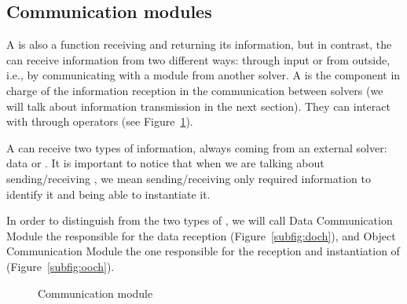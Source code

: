 \subsection{Communication modules}


A \opch{} is also a function receiving and returning its information, but in contrast, the \opch{} can receive information from two different ways: through input or from outside, i.e., by communicating with a module from another solver. A \opch{} is the component in charge of the information reception in the communication between solvers (we will talk about information transmission in the next section). They can interact with \oms{} through operators (see Figure~\ref{fig:och}).

A \opch{} can receive two types of information, always coming from an external solver: data or \oms{}. It is important to notice that when we are talking about sending/receiving \oms, we mean sending/receiving only required information to identify it and being able to instantiate it.

In order to distinguish from the two types of \opchs, we will call Data Communication Module the \opch{} responsible for the data reception (Figure~\ref{subfig:doch}), and Object Communication Module the one responsible for the reception and instantiation of \oms{} (Figure~\ref{subfig:ooch}).


%

\begin{figure}
	\centering
	\hspace{0.05\textwidth}%
	\caption[]{Communication module}
	\label{fig:och}
\end{figure}

